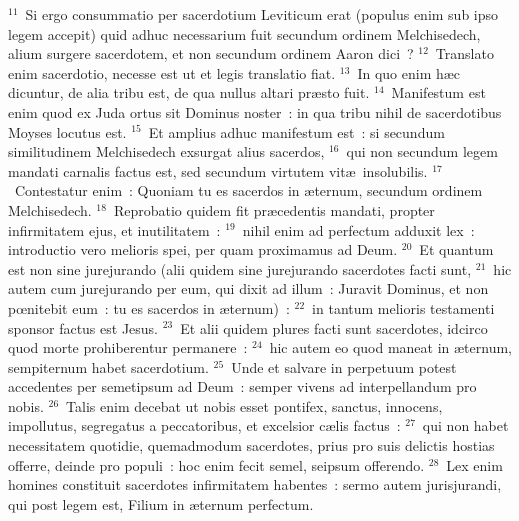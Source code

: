 ${}^{11}$~Si ergo consummatio per sacerdotium Leviticum erat (populus enim sub ipso legem accepit) quid adhuc necessarium fuit secundum ordinem Melchisedech, alium surgere sacerdotem, et non secundum ordinem Aaron dici~?
${}^{12}$~Translato enim sacerdotio, necesse est ut et legis translatio fiat.
${}^{13}$~In quo enim h\ae c dicuntur, de alia tribu est, de qua nullus altari pr\ae sto fuit.
${}^{14}$~Manifestum est enim quod ex Juda ortus sit Dominus noster~: in qua tribu nihil de sacerdotibus Moyses locutus est.
${}^{15}$~Et amplius adhuc manifestum est~: si secundum similitudinem Melchisedech exsurgat alius sacerdos,
${}^{16}$~qui non secundum legem mandati carnalis factus est, sed secundum virtutem vit\ae\ insolubilis.
${}^{17}$~Contestatur enim~: Quoniam tu es sacerdos in \ae ternum, secundum ordinem Melchisedech.
${}^{18}$~Reprobatio quidem fit pr\ae cedentis mandati, propter infirmitatem ejus, et inutilitatem~:
${}^{19}$~nihil enim ad perfectum adduxit lex~: introductio vero melioris spei, per quam proximamus ad Deum.
${}^{20}$~Et quantum est non sine jurejurando (alii quidem sine jurejurando sacerdotes facti sunt,
${}^{21}$~hic autem cum jurejurando per eum, qui dixit ad illum~: Juravit Dominus, et non pœnitebit eum~: tu es sacerdos in \ae ternum)~:
${}^{22}$~in tantum melioris testamenti sponsor factus est Jesus.
${}^{23}$~Et alii quidem plures facti sunt sacerdotes, idcirco quod morte prohiberentur permanere~:
${}^{24}$~hic autem eo quod maneat in \ae ternum, sempiternum habet sacerdotium.
${}^{25}$~Unde et salvare in perpetuum potest accedentes per semetipsum ad Deum~: semper vivens ad interpellandum pro nobis.
${}^{26}$~Talis enim decebat ut nobis esset pontifex, sanctus, innocens, impollutus, segregatus a peccatoribus, et excelsior c\ae lis factus~:
${}^{27}$~qui non habet necessitatem quotidie, quemadmodum sacerdotes, prius pro suis delictis hostias offerre, deinde pro populi~: hoc enim fecit semel, seipsum offerendo.
${}^{28}$~Lex enim homines constituit sacerdotes infirmitatem habentes~: sermo autem jurisjurandi, qui post legem est, Filium in \ae ternum perfectum.

